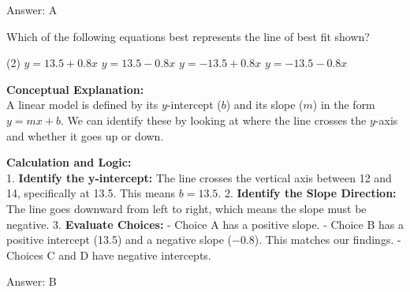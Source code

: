 \documentclass[11pt,paper=a4,answers]{exam}
\begin{document}
\begin{questions}
\begin{solution}
Answer: \colorbox{yellow!100}{A}
\end{solution}

\vspace{60pt}

\question
\begin{center}
\end{center}
Which of the following equations best represents the line of best fit shown?
\begin{tasks}(2)
    \task $y = 13.5 + 0.8x$
    \task $y = 13.5 - 0.8x$
    \task $y = -13.5 + 0.8x$
    \task $y = -13.5 - 0.8x$
\end{tasks}

\begin{solution}
\textbf{Conceptual Explanation:} \\
A linear model is defined by its $y$-intercept ($b$) and its slope ($m$) in the form $y = mx + b$. We can identify these by looking at where the line crosses the $y$-axis and whether it goes up or down.

\vspace{30pt}

\textbf{Calculation and Logic:} \\
1. \textbf{Identify the y-intercept:} The line crosses the vertical axis between 12 and 14, specifically at 13.5. This means $b = 13.5$.
2. \textbf{Identify the Slope Direction:} The line goes downward from left to right, which means the slope must be negative.
3. \textbf{Evaluate Choices:} 
   - Choice A has a positive slope.
   - Choice B has a positive intercept (13.5) and a negative slope ($-0.8$). This matches our findings.
   - Choices C and D have negative intercepts.

\vspace{30pt}

Answer: \colorbox{yellow!100}{B}
\end{solution}


\end{questions}
\end{document}
